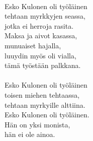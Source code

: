 \hspace{10mm} \\
            Esko Kulonen oli työläinen \\
            tehtaan myrkkyjen seassa, \\
            jotka ei herroja rasita. \\
            Maksa ja aivot kasassa, \\
            munuaiset hajalla, \\
            luuydin myös oli vialla, \\
            tämä työstään palkkana. \\
\hspace{10mm} \\
            Esko Kulonen oli työläinen \\
            toisen miehen tehtaassa, \\
            tehtaan myrkyille alttiina. \\
            Esko Kulonen oli työläinen. \\
            Hän on yksi monista, \\
            hän ei ole ainoa. \\
